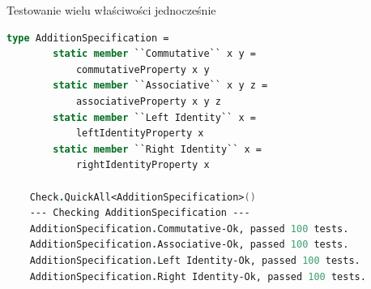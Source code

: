     \begin{frame}[fragile]{Testowanie wielu właściwości jednocześnie}
    \begin{lstlisting}[language=FSharp, xleftmargin=-10pt,xrightmargin=-10pt,numbers=none,basicstyle=\ttfamily\small]
    type AdditionSpecification =
        static member ``Commutative`` x y =
            commutativeProperty x y
        static member ``Associative`` x y z =
            associativeProperty x y z
        static member ``Left Identity`` x =
            leftIdentityProperty x
        static member ``Right Identity`` x =
            rightIdentityProperty x

    Check.QuickAll<AdditionSpecification>()
    --- Checking AdditionSpecification ---
    AdditionSpecification.Commutative-Ok, passed 100 tests.
    AdditionSpecification.Associative-Ok, passed 100 tests.
    AdditionSpecification.Left Identity-Ok, passed 100 tests.
    AdditionSpecification.Right Identity-Ok, passed 100 tests.
    \end{lstlisting}
    \end{frame}